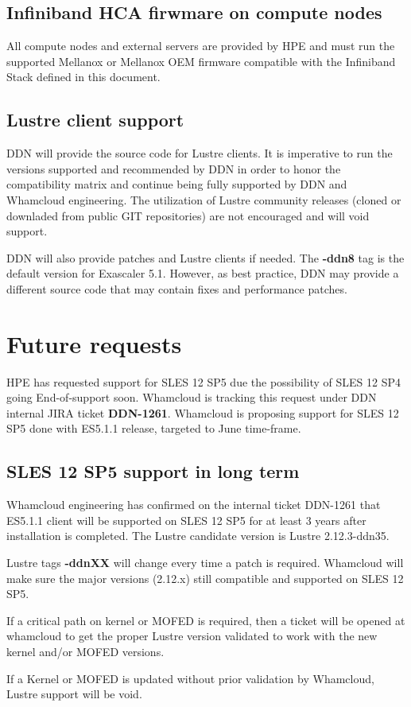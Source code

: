 \documentclass{article}
\begin{document}
\subsection{Infiniband HCA firwmare on compute nodes}
All compute nodes and external servers are provided by HPE and must run the supported Mellanox or Mellanox OEM firmware compatible with the Infiniband Stack defined in this document. 

\subsection{Lustre client support}
DDN will provide the source code for Lustre clients. It is imperative to run the versions supported and recommended by DDN in order to honor the compatibility matrix and continue being fully supported by DDN and Whamcloud engineering. The utilization of Lustre community releases (cloned or downladed from public GIT repositories) are not encouraged and will void support.

DDN will also provide patches and Lustre clients if needed. The \textbf{-ddn8} tag is the default version for Exascaler 5.1. However, as best practice, DDN may provide a different source code that may contain fixes and performance patches.

\section{Future requests}
HPE has requested support for SLES 12 SP5 due the possibility of SLES 12 SP4 going End-of-support soon. Whamcloud is tracking this request under DDN internal JIRA ticket \textbf{DDN-1261}. Whamcloud is proposing support for SLES 12 SP5 done with ES5.1.1 release, targeted to June time-frame. 

\subsection{SLES 12 SP5 support in long term}
Whamcloud engineering has confirmed on the internal ticket DDN-1261 that ES5.1.1 client will be supported on SLES 12 SP5 for at least 3 years after installation is completed. The Lustre candidate version is Lustre 2.12.3-ddn35. 

Lustre tags \textbf{-ddnXX} will change every time a patch is required. Whamcloud will make sure the major versions (2.12.x) still compatible and supported on SLES 12 SP5. 

If a critical path on kernel or MOFED is required, then a ticket will be opened at whamcloud to get the proper Lustre version validated to work with the new kernel and/or MOFED versions.

If a Kernel or MOFED is updated without prior validation by Whamcloud, Lustre support will be void.
\end{document}
